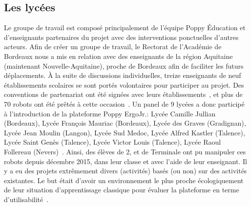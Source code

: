     \subsection{Les lycées}
        Le groupe de travail est composé principalement de l'équipe Poppy Éducation et d'enseignants partenaires du projet avec des interventions ponctuelles d’autres acteurs.
        Afin de créer un groupe de travail, le Rectorat de l’Académie de Bordeaux nous a mis en relation avec des enseignants de la région Aquitaine (maintenant Nouvelle-Aquitaine), proche de Bordeaux afin de faciliter les futurs déplacements. À la suite de discussions individuelles, treize enseignants de neuf établissements scolaires se sont portés volontaires pour participer au projet. Des conventions de partenariat ont été signées avec leurs établissements~, et plus de 70 robots ont été prêtés à cette occasion~.
        Un panel de 9 lycées a donc participé à l'introduction de la plateforme Poppy ErgoJr.: Lycée Camille Jullian (Bordeaux), Lycée François Mauriac (Bordeaux), Lycée des Graves (Gradignan), Lycée Jean Moulin (Langon), Lycée Sud Medoc, Lycée Alfred Kastler (Talence), Lycée Saint Genès (Talence), Lycée Victor Louis (Talence), Lycée Raoul Follereau (Nevers)~. Ainsi, des élèves de 2\nd {}, et de Terminale  ont pu manipuler ces robots depuis décembre 2015, dans leur classe et avec l'aide de leur enseignant. Il y a eu des projets extrêmement divers (\cf activités) basés (ou non) sur des activités existantes. Le but était d'avoir un environnement le plus proche écologiquement de leur situation d'apprentissage classique pour évaluer la plateforme en terme d'utilisabilité~.
